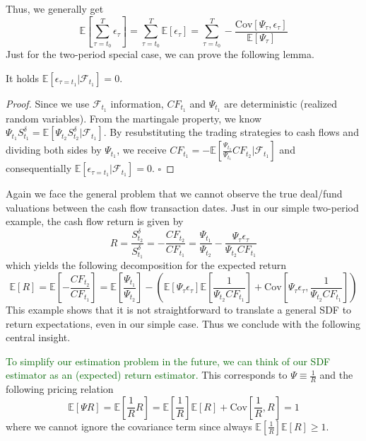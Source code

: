 Thus, we generally get
\[
\mathbb{E} \left[ \sum_{\tau=t_0}^T  \epsilon_{\tau} \right] = 
\sum_{\tau=t_0}^T \mathbb{E} \left[ \epsilon_{\tau} \right] = 
\sum_{\tau=t_0}^T - \frac{\mathrm{Cov} \left[ \Psi_{\tau}, \epsilon_{\tau} \right]}{\mathbb{E} \left[ \Psi_{\tau} \right]}
\]
Just for the two-period special case, we can prove the following lemma.

\begin{lemma}
	It holds $\mathbb{E} \left[ \epsilon_{\tau = t_1} | \mathcal{F}_{t_1} \right] = 0$.
\end{lemma}

\begin{proof}
	Since we use $\mathcal{F}_{t_1}$ information, $CF_{t_1}$ and $\Psi_{t_1}$ are deterministic (realized random variables).
	From the martingale property, we know $\Psi_{t_1} S_{t_1}^{\delta} = \mathbb{E} \left[ \Psi_{t_2} S_{t_2}^{\delta} | \mathcal{F}_{t_1} \right]$.
	By resubstituting the trading strategies to cash flows and dividing both sides by $\Psi_{t_1}$, we receive $CF_{t_1} = - \mathbb{E} \left[ \frac{\Psi_{t_2}}{\Psi_{t_1}}  {CF}_{t_2} | \mathcal{F}_{t_1} \right]$ and consequentially $\mathbb{E} \left[ \epsilon_{\tau = t_1} | \mathcal{F}_{t_1} \right] = 0$. $\square$
\end{proof}

Again we face the general problem that we cannot observe the true deal/fund valuations between the cash flow transaction dates.
Just in our simple two-period example, the cash flow return is given by
\[
R = \frac{S_{t_2}^{\delta}}{S_{t_1}^{\delta}} = - \frac{CF_{t_2}}{CF_{t_1}} =
\frac{\Psi_{t_1}}{\Psi_{t_2}} - \frac{\Psi_{\tau} \epsilon_{\tau}}{\Psi_{t_2} CF_{t_1}}
\]
which yields the following decomposition for the expected return
\[
\mathbb{E} \left[ R \right] = 
\mathbb{E} \left[ - \frac{CF_{t_2}}{CF_{t_1}} \right] =
\mathbb{E} \left[ \frac{\Psi_{t_1}}{\Psi_{t_2}} \right] -
\left(
\mathbb{E} \left[ \Psi_{\tau} \epsilon_{\tau} \right]
\mathbb{E} \left[ \frac{1}{\Psi_{t_2}CF_{t_1}} \right]
+
\mathrm{Cov} \left[ \Psi_{\tau} \epsilon_{\tau},\frac{1}{\Psi_{t_2}CF_{t_1}} \right]
\right)
\]
This example shows that it is not straightforward to translate a general SDF to return expectations, even in our simple case.
Thus we conclude with the following central insight.

\begin{remark}
	\textcolor{darkgreen}{To simplify our estimation problem in the future, we can think of our SDF estimator as an (expected) return estimator.}
	This corresponds to $\Psi \equiv \frac{1}{R}$ and the following pricing relation
	\[
	\mathbb{E} \left[ \Psi R \right] = \mathbb{E} \left[ \frac{1}{R} R \right] = 
	\mathbb{E} \left[ \frac{1}{R} \right] \mathbb{E} \left[ R \right] + \mathrm{Cov} \left[ \frac{1}{R}, R \right] = 1
	\]
	where we cannot ignore the covariance term since always $\mathbb{E} \left[ \frac{1}{R} \right] \mathbb{E} \left[ R \right] \geq 1$.
\end{remark}

